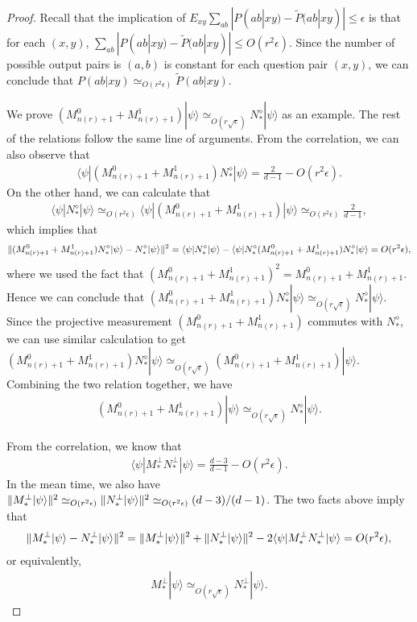 \documentclass[11pt,letterpaper]{article}
\newcommand{\ket}[1]{|#1\rangle}
\newcommand{\bra}[1]{\langle#1|}
\DeclarePairedDelimiter{\norm}{\lVert}{\rVert}
\newcommand{\1}{\mathbb{1}}
\newcommand{\nr}{n(r)}
\newcommand{\pr}[2]{P(#1|#2)}
\newcommand{\tpr}[2]{\tilde{P}(#1|#2)}
\newcommand{\ep}{\epsilon}
\newcommand{\se}{\sqrt{\epsilon}}
\newcommand{\appd}[1]{\simeq_{#1}}
\theoremstyle{definition}
\begin{document}
\begin{proof} 

Recall that the implication of $E_{xy} \sum_{ab} |\pr{ab}{xy} - \tpr{ab}{xy}| \leq \ep$ is that 
for each $(x,y)$, $\sum_{ab} |\pr{ab}{xy} - \tpr{ab}{xy}| \leq O(r^2 \epsilon)$. Since 
the number of possible output pairs is $(a,b)$ is constant for each question pair $(x,y)$, 
we can conclude that $\pr{ab}{xy} \appd{O(r^2\ep)} \tpr{ab}{xy}$. 

We prove $(M_{\nr+1}^0+M_{\nr+1}^1)\ket{\psi} \appd{O(r\se)} N_\ast^\diamond \ket{\psi}$ as an example.
The rest of the relations follow the same line of arguments.
From the correlation, we can also observe that
\begin{align}
 \bra{\psi} (M_{\nr+1}^0+M_{\nr+1}^1)N_\ast^\diamond \ket{\psi} = \frac{2}{d-1} - O(r^2 \epsilon).
\end{align}
On the other hand, we can calculate that 
\begin{align}
	\bra{\psi} N_\ast^\diamond \ket{\psi} \appd{O(r^2\epsilon)} 
 \bra{\psi}(M_{\nr+1}^0+M_{\nr+1}^1)\ket{\psi} \appd{O(r^2\epsilon)} \frac{2}{d-1},
\end{align}
which implies that 
\begin{align}
	\norm{(M_{\nr+1}^0 + M_{\nr+1}^1)N_\ast^\diamond \ket{\psi} - N_\ast^\diamond\ket{\psi}}^2 
	= \bra{\psi} N_\ast^\diamond \ket{\psi} - \bra{\psi}N_\ast^\diamond(M_{\nr+1}^0 + M_{\nr+1}^1)N_\ast^\diamond \ket{\psi}
	= O(r^2 \epsilon),
\end{align}
where we used the fact that $(M_{\nr+1}^0 + M_{\nr+1}^1)^2 = M_{\nr+1}^0 + M_{\nr+1}^1$.
Hence we can conclude that $(M_{\nr+1}^0 + M_{\nr+1}^1)N_\ast^\diamond \ket{\psi} \appd{O(r\se)} N_\ast^\diamond\ket{\psi}$.
Since the projective measurement $(M_{\nr+1}^0+M_{\nr+1}^1)$ commutes with $N_\ast^\diamond$, we can use similar calculation to get
$(M_{\nr+1}^0 + M_{\nr+1}^1)N_\ast^\diamond \ket{\psi} \appd{O(r\se)} (M_{\nr+1}^0 + M_{\nr+1}^1)\ket{\psi}$.
Combining the two relation together, we have
\begin{align}
	(M_{\nr+1}^0 + M_{\nr+1}^1) \ket{\psi} \appd{O(r\se)} N_\ast^\diamond \ket{\psi}.
\end{align}

From the correlation, we know that 
\begin{align}
	\bra{\psi} M_\ast^\perp N_\ast^\perp \ket{\psi} = \frac{d-3}{d-1} - O(r^2 \ep).
\end{align}
In the mean time, we also have 
$\norm{M_\ast^\perp \ket{\psi}}^2 \appd{O(r^2\ep)} \norm{N_\ast^\perp\ket{\psi}}^2 \appd{O(r^2\ep)} (d-3)/(d-1)$.
The two facts above imply that 
\begin{align}
	\norm{M_\ast^\perp \ket{\psi} - N_\ast^\perp \ket{\psi}}^2 = \norm{M_\ast^\perp \ket{\psi}}^2 + \norm{N_\ast^\perp \ket{\psi}}^2
	- 2 \bra{\psi} M_\ast^\perp N_\ast^\perp \ket{\psi}  = O(r^2 \ep),
\end{align}
or equivalently,
\begin{align}
	M_\ast^\perp \ket{\psi} \appd{O(r\se)} N_\ast^\perp \ket{\psi}.
\end{align}
\end{proof}
\end{document}
